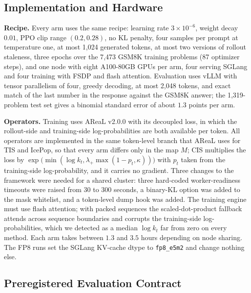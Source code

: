 \subsection{Implementation and Hardware}
\label{app:experimental-implementation}

\noindent\textbf{Recipe.}
Every arm uses the same recipe: learning rate $3\times10^{-6}$, weight decay $0.01$, PPO clip range $(0.2,0.28)$, no KL penalty, four samples per prompt at temperature one, at most 1{,}024 generated tokens, at most two versions of rollout staleness, three epochs over the 7{,}473 GSM8K training problems (87 optimizer steps), and one node with eight A100-80GB GPUs per arm, four serving SGLang and four training with FSDP and flash attention. Evaluation uses vLLM with tensor parallelism of four, greedy decoding, at most 2{,}048 tokens, and exact match of the last number in the response against the GSM8K answer; the 1{,}319-problem test set gives a binomial standard error of about $1.3$ points per arm.

\noindent\textbf{Operators.}
Training uses AReaL v2.0.0 with its decoupled loss, in which the rollout-side and training-side log-probabilities are both available per token. All operators are implemented in the same token-level branch that AReaL uses for TIS and IcePop, so that every arm differs only in the map $M$; CIS multiplies the loss by $\exp\big(\min(\log k_t,\lambda_+\max(1-p_t,\kappa))\big)$ with $p_t$ taken from the training-side log-probability, and it carries no gradient. Three changes to the framework were needed for a shared cluster: three hard-coded worker-readiness timeouts were raised from 30 to 300 seconds, a binary-KL option was added to the mask whitelist, and a token-level dump hook was added. The training engine must use flash attention; with packed sequences the scaled-dot-product fallback attends across sequence boundaries and corrupts the training-side log-probabilities, which we detected as a median $\log k_t$ far from zero on every method. Each arm takes between $1.3$ and $3.5$ hours depending on node sharing. The FP8 runs set the SGLang KV-cache dtype to \texttt{fp8\_e5m2} and change nothing else.

\subsection{Preregistered Evaluation Contract}
\label{app:experimental-contract}

